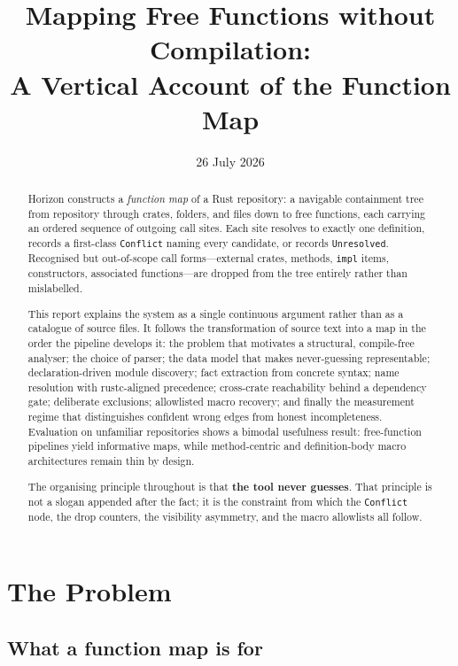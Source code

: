 \documentclass[11pt,a4paper,oneside]{report}
\title{Mapping Free Functions without Compilation:\\[0.35em]
  \large A Vertical Account of the \horizon{} Function Map}
\author{}
\date{26 July 2026}
\newcommand{\horizon}{Horizon}
\begin{document}
\maketitle

\begin{abstract}
\horizon{} constructs a \emph{function map} of a Rust repository: a navigable
containment tree from repository through crates, folders, and files down to
free functions, each carrying an ordered sequence of outgoing call sites.
Each site resolves to exactly one definition, records a first-class
\texttt{Conflict} naming every candidate, or records \texttt{Unresolved}.
Recognised but out-of-scope call forms---external crates, methods,
\texttt{impl} items, constructors, associated functions---are dropped from the
tree entirely rather than mislabelled.

This report explains the system as a single continuous argument rather than as
a catalogue of source files. It follows the transformation of source text into
a map in the order the pipeline develops it: the problem that motivates a
structural, compile-free analyser; the choice of parser; the data model that
makes never-guessing representable; declaration-driven module discovery;
fact extraction from concrete syntax; name resolution with rustc-aligned
precedence; cross-crate reachability behind a dependency gate; deliberate
exclusions; allowlisted macro recovery; and finally the measurement regime
that distinguishes confident wrong edges from honest incompleteness.
Evaluation on unfamiliar repositories shows a bimodal usefulness result:
free-function pipelines yield informative maps, while method-centric and
definition-body macro architectures remain thin by design.

The organising principle throughout is that \textbf{the tool never guesses}.
That principle is not a slogan appended after the fact; it is the constraint
from which the \texttt{Conflict} node, the drop counters, the visibility
asymmetry, and the macro allowlists all follow.
\end{abstract}

\tableofcontents
\clearpage
{}

\chapter{The Problem}
\label{ch:problem}

\section{What a function map is for}
\end{document}
